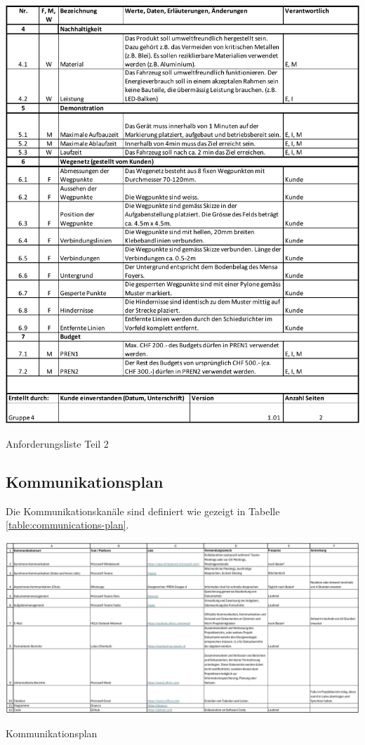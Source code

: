 \begin{table}[H]
\centering
\includegraphics[width=\textwidth]{assets/Anforderungsliste_V1.01_page2.pdf}
\caption{Anforderungsliste Teil 2}
\label{table:anforderungsliste_page2}
\end{table}
\newpage

\begin{landscape}
\subsection*{Kommunikationsplan}\label{kommunikationsplan}

Die Kommunikationskanäle sind definiert wie gezeigt in Tabelle \ref{table:communications-plan}.

\begin{table}[H]
\centering
\includegraphics[width=240mm]{assets/Kommunikationschnittstellen.pdf}
\caption{Kommunikationsplan}
\label{table:communications-plan}
\end{table}
\end{landscape}

